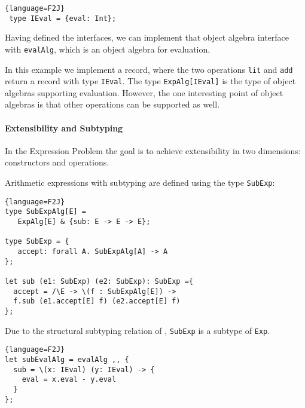 \begin{lstlisting}{language=F2J}
 type IEval = {eval: Int};
\end{lstlisting}

Having defined the interfaces, we can implement that object algebra interface
with \lstinline$evalAlg$, which is an object algebra for evaluation.
\begin{comment}
  \begin{lstlisting}{language=F2J}
    let evalAlg: ExpAlg[IEval] = {
      lit = \(x: Int) -> {eval = x},
      add = \(x: IEval) (y: IEval) -> {
        eval = x.eval + y.eval
      }
    };
  \end{lstlisting}
\end{comment}

In this example we implement a record, where the two operations
\lstinline{lit} and \lstinline{add} return a record with type \lstinline{IEval}.
The type \lstinline$ExpAlg[IEval]$ is the type of object algebras
supporting evaluation. However, the one interesting point
of object algebras is that other operations can be supported as
well.

\paragraph{Extensibility and Subtyping} In the Expression Problem the goal is to
achieve extensibility in two dimensions: constructors and operations.

Arithmetic expressions with subtyping are defined using the type \lstinline{SubExp}:

\begin{lstlisting}{language=F2J}
type SubExpAlg[E] =
   ExpAlg[E] & {sub: E -> E -> E};

type SubExp = {
   accept: forall A. SubExpAlg[A] -> A
};

let sub (e1: SubExp) (e2: SubExp): SubExp ={
  accept = /\E -> \(f : SubExpAlg[E]) ->
  f.sub (e1.accept[E] f) (e2.accept[E] f)
};
\end{lstlisting}


Due to the structural subtyping relation of \name, \lstinline{SubExp}
is a subtype of \lstinline{Exp}.

\begin{lstlisting}{language=F2J}
let subEvalAlg = evalAlg ,, {
  sub = \(x: IEval) (y: IEval) -> {
    eval = x.eval - y.eval
  }
};
\end{lstlisting}


